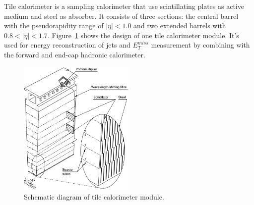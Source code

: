 Tile calorimeter is a sampling calorimeter that use scintillating plates as active medium and steel as absorber.
It consists of three sections: the central barrel with the pseudorapidity range of $|\eta|<1.0$ and two extended barrels with $0.8 < |\eta| < 1.7$.
Figure~\ref{fig:calo_tile} shows the design of one tile calorimeter module.
It's used for energy reconstruction of jets and $E_{T}^{miss}$ measurement by combining with the forward and end-cap hadronic calorimeter.
\begin{figure}[!htb]
  \centering
  \includegraphics[width=0.5\textwidth]{figures/Detector/calo_tile.png}
  \caption{Schematic diagram of tile calorimeter module\cite{Aad:2010}.}
  \label{fig:calo_tile}
\end{figure}

